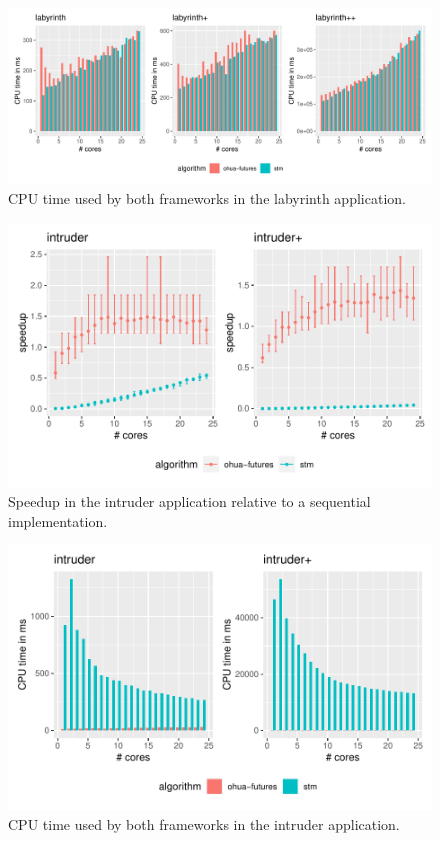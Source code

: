 \begin{figure}
    \centering
    \includegraphics[width=\textwidth,keepaspectratio]{gfx/results/cpu_labyrinth_comb}
    \caption{CPU time used by both frameworks in the labyrinth application.}%
    \label{fig:evaluation:labyrinth-cpu}
\end{figure}

\begin{figure}
    \centering
    \includegraphics[width=.66\textwidth,keepaspectratio]{gfx/results/intruder_comb}
    \caption{Speedup in the intruder application relative to a sequential implementation.}%
    \label{fig:evaluation:intruder}
\end{figure}

\begin{figure}
    \centering
    \includegraphics[width=.66\textwidth,keepaspectratio]{gfx/results/cpu_intruder_comb}
    \caption{CPU time used by both frameworks in the intruder application.}%
    \label{fig:evaluation:intruder-cpu}
\end{figure}

